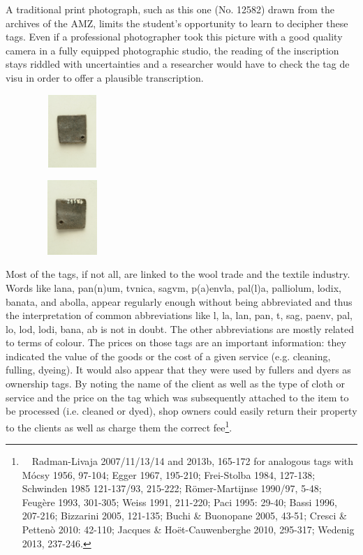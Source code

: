 \documentclass[amsthm,ebook]{saparticle}
\begin{document}
A traditional print photograph, such as this one (No. 12582) drawn from the archives of the AMZ, limits the student’s
opportunity to learn to decipher these tags. Even if a professional photographer took this picture with a good quality
camera in a fully equipped photographic studio, the reading of the inscription stays riddled with uncertainties and a
researcher would have to check the tag de visu in order to offer a plausible transcription.

\begin{figure}
\centering
\includegraphics[width=2.944cm,height=2.752cm]{EAGLE16lameetalteaching-img001.jpg}
\end{figure}
\begin{figure}
\centering
\includegraphics[width=2.944cm,height=2.82cm]{EAGLE16lameetalteaching-img002.jpg}
\end{figure}
Most of the tags, if not all, are linked to the wool trade and the textile industry. Words like lana, pan(n)um, tvnica,
sagvm, p(a)envla, pal(l)a, palliolum, lodix, banata, and abolla, appear regularly enough without being abbreviated and
thus the interpretation of common abbreviations like l, la, lan, pan, t, sag, paenv, pal, lo, lod, lodi, bana, ab is
not in doubt. The other abbreviations are mostly related to terms of colour. The prices on those tags are an important
information: they indicated the value of the goods or the cost of a given service (e.g. cleaning, fulling, dyeing). It
would also appear that they were used by fullers and dyers as ownership tags. By noting the name of the client as well
as the type of cloth or service and the price on the tag which was subsequently attached to the item to be processed
(i.e. cleaned or dyed), shop owners could easily return their property to the clients as well as charge them the
correct fee\footnote{\par \ \  Radman-Livaja 2007/11/13/14 and 2013b, 165-172 for analogous tags with Mócsy 1956,
97-104; Egger 1967, 195-210; Frei-Stolba 1984, 127-138; Schwinden 1985 121-137/93, 215-222; Römer-Martijnse 1990/97,
5-48; Feugère 1993, 301-305; Weiss 1991, 211-220; Paci 1995: 29-40; Bassi 1996, 207-216; Bizzarini 2005, 121-135; Buchi
\& Buonopane 2005, 43-51; Cresci \& Pettenò 2010: 42-110; Jacques \& Hoët-Cauwenberghe 2010, 295-317; Wedenig 2013,
237-246.}. 
\end{document}
